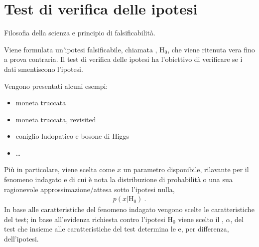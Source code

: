 \documentclass[letterpaper,10pt,italian]{jupyterBook}
\begin{document}
\section{Test di verifica delle ipotesi}
\label{\detokenize{ch/statistics/hp-test:test-di-verifica-delle-ipotesi}}\label{\detokenize{ch/statistics/hp-test:statistics-hs-inference-hp-test}}\label{\detokenize{ch/statistics/hp-test::doc}}
\sphinxAtStartPar
{} Filosofia della scienza e principio di falsificabilità.

\sphinxAtStartPar
{} Viene formulata un’ipotesi falsificabile, chiamata , \(\text{H}_{0}\), che viene ritenuta vera fino a prova contraria. Il test di verifica delle ipotesi ha l’obiettivo di verificare se i dati smentiscono l’ipotesi.

\sphinxAtStartPar
Vengono presentati alcuni esempi:
\begin{itemize}
\item {} 
\sphinxAtStartPar
moneta truccata

\item {} 
\sphinxAtStartPar
moneta truccata, revisited

\item {} 
\sphinxAtStartPar
coniglio ludopatico e bosone di Higgs

\item {} 
\sphinxAtStartPar
…

\end{itemize}

\sphinxAtStartPar
Più in particolare, viene scelta come  \(x\) un parametro disponibile, rilavante per il fenomeno indagato e di cui è nota la distribuzione di probabilità \sphinxhyphen{} o una sua ragionevole approssimazione/attesa \sphinxhyphen{} sotto l’ipotesi nulla,
\begin{equation*}
\begin{split}p(x|\text{H}_0) \ .\end{split}
\end{equation*}
\sphinxAtStartPar
In base alle caratteristiche del fenomeno indagato vengono scelte le caratteristiche del test; in base all’evidenza richiesta contro l’ipotesi \(\text{H}_0\) viene scelto il , \(\alpha\), del test che \sphinxhyphen{} insieme alle caratteristiche del test \sphinxhyphen{} determina le  e, per differenza,  dell’ipotesi.
\end{document}
